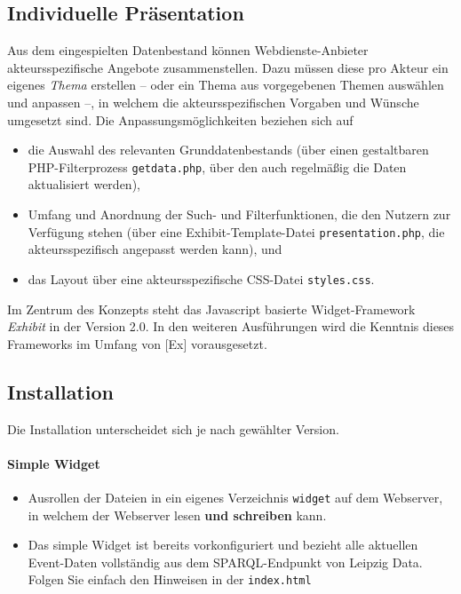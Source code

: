 \documentclass[11pt,a4paper]{article}
\begin{document}
\subsection{Individuelle Präsentation}
Aus dem eingespielten Datenbestand können Webdienste-Anbieter
akteursspezifische Angebote zusammenstellen.  Dazu müssen diese pro Akteur ein
eigenes \emph{Thema} erstellen -- oder ein Thema aus vorgegebenen Themen
auswählen und anpassen --, in welchem die akteursspezifischen Vorgaben und
Wünsche umgesetzt sind.  Die Anpassungsmöglichkeiten beziehen sich auf
\begin{itemize}
\item die Auswahl des relevanten Grunddatenbestands (über einen gestaltbaren
  PHP-Filter\-prozess \texttt{getdata.php}, über den auch regelmäßig die Daten
  aktualisiert werden),
\item Umfang und Anordnung der Such- und Filterfunktionen, die den Nutzern zur
  Verfügung stehen (über eine Exhibit-Template-Datei
  \texttt{presentation.php}, die akteursspezifisch angepasst werden kann), und
\item das Layout über eine akteursspezifische CSS-Datei \texttt{styles.css}. 
\end{itemize}
Im Zentrum des Konzepts steht das Javascript basierte Widget-Framework
\emph{Exhibit} in der Version 2.0. In den weiteren Ausführungen wird die
Kenntnis dieses Frameworks im Umfang von [Ex] vorausgesetzt.

\subsection{Installation}
Die Installation unterscheidet sich je nach gewählter Version.

\paragraph{Simple Widget}
\begin{itemize}
\item Ausrollen der Dateien in ein eigenes Verzeichnis \texttt{widget} auf dem
  Webserver, in welchem der Webserver lesen \textbf{und schreiben} kann.
\item Das simple Widget ist bereits vorkonfiguriert und bezieht alle aktuellen
  Event-Daten vollständig aus dem SPARQL-Endpunkt von Leipzig Data. Folgen Sie
  einfach den Hinweisen in der \texttt{index.html}
\end{itemize}
\end{document}

